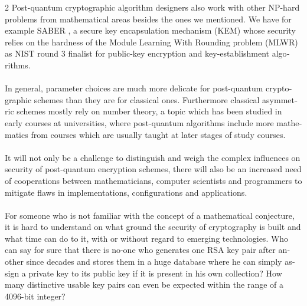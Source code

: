 \documentclass[a4paper,11pt]{article}
\begin{document}
\begin{otherlanguage}{english}
\begin{multicols}{2}
Post-quantum cryptographic algorithm designers also work with other NP-hard problems from mathematical areas besides the ones we mentioned. We have for example \textsc{SABER} \cite{SAB}, a secure key encapsulation mechanism (KEM) whose security relies on the hardness of the Module Learning With Rounding problem (MLWR) as NIST round 3 finalist for public-key encryption and key-establishment algorithms. \\ 
\\
In general, parameter choices are much more delicate for post-quantum cryptographic schemes than they are for classical ones. Furthermore classical asymmetric schemes mostly rely on number theory, a topic which has been studied in early courses at universities, where post-quantum algorithms include more mathematics from courses which are usually taught at later stages of study courses. \\
\\
It will not only be a challenge to distinguish and weigh the complex influences on security of post-quantum encryption schemes, there will also be an increased need of cooperations between mathematicians, computer scientists and programmers to mitigate flaws in implementations, configurations and applications. \\
\\
For someone who is not familiar with the concept of a mathematical conjecture, it is hard to understand on what ground the security of cryptography is built and what time can do to it, with or without regard to emerging technologies. Who can say for sure that there is no-one who generates one RSA key pair after another since decades and stores them in a huge database where he can simply assign a private key to its public key if it is present in his own collection? How many distinctive usable key pairs can even be expected within the range of a 4096-bit integer? 

\vspace{1cm}





\end{multicols}
\end{otherlanguage}
\end{document}

